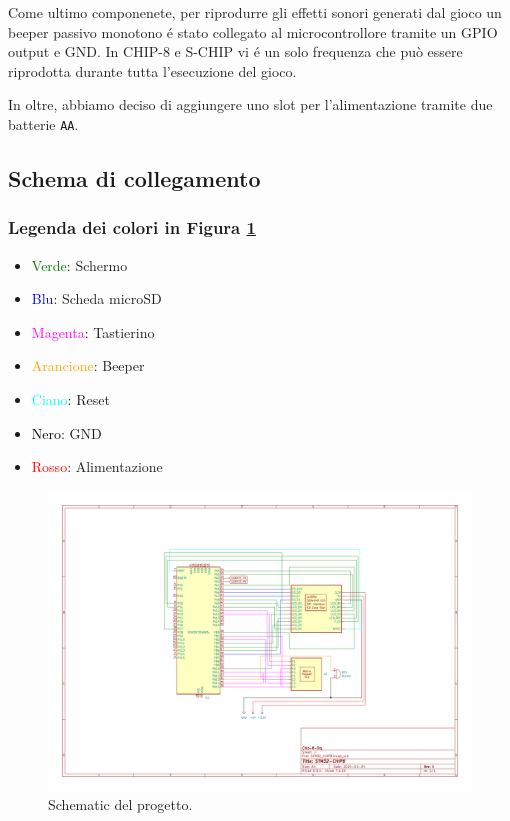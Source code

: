 \documentclass[a4paper]{article}
\begin{document}
Come ultimo componenete, per riprodurre gli effetti sonori generati dal gioco
un beeper passivo monotono é stato collegato al microcontrollore tramite un
GPIO output e GND. In CHIP-8 e S-CHIP vi é un solo frequenza che può
essere riprodotta durante tutta l'esecuzione del gioco.

In oltre, abbiamo deciso di aggiungere uno slot per l'alimentazione tramite
due batterie \texttt{AA}.

\subsection{Schema di collegamento}

\subsubsection{Legenda dei colori in Figura \ref{fig:schematic}}

\begin{itemize}
    \item \textcolor{green}{Verde}: Schermo
    \item \textcolor{blue}{Blu}: Scheda microSD
    \item \textcolor{magenta}{Magenta}: Tastierino
    \item \textcolor{orange}{Arancione}: Beeper
    \item \textcolor{cyan}{Ciano}: Reset
    \item \textcolor{black}{Nero}: GND
    \item \textcolor{red}{Rosso}: Alimentazione
\end{itemize}

\begin{figure}[h]
    \begin{center}
        \includegraphics[scale=0.50]{figures/STM32_CHIP8.pdf}
    \end{center}
    \caption{
        Schematic del progetto.
    }
    \label{fig:schematic}
\end{figure}
\end{document}
